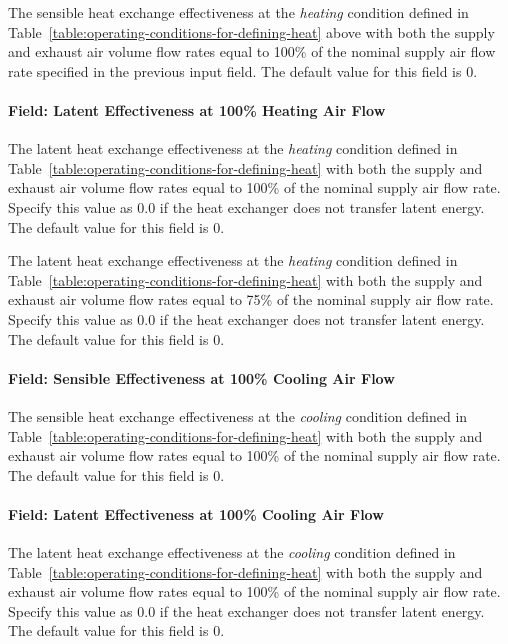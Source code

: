 The sensible heat exchange effectiveness at the \emph{heating} condition defined in Table~\ref{table:operating-conditions-for-defining-heat} above with both the supply and exhaust air volume flow rates equal to 100\% of the nominal supply air flow rate specified in the previous input field. The default value for this field is 0.

\paragraph{Field: Latent Effectiveness at 100\% Heating Air Flow}\label{field-latent-effectiveness-at-100-heating-air-flow}

The latent heat exchange effectiveness at the \emph{heating} condition defined in Table~\ref{table:operating-conditions-for-defining-heat} with both the supply and exhaust air volume flow rates equal to 100\% of the nominal supply air flow rate. Specify this value as 0.0 if the heat exchanger does not transfer latent energy. The default value for this field is 0.

The latent heat exchange effectiveness at the \emph{heating} condition defined in Table~\ref{table:operating-conditions-for-defining-heat} with both the supply and exhaust air volume flow rates equal to 75\% of the nominal supply air flow rate. Specify this value as 0.0 if the heat exchanger does not transfer latent energy. The default value for this field is 0.

\paragraph{Field: Sensible Effectiveness at 100\% Cooling Air Flow}\label{field-sensible-effectiveness-at-100-cooling-air-flow}

The sensible heat exchange effectiveness at the \emph{cooling} condition defined in Table~\ref{table:operating-conditions-for-defining-heat} with both the supply and exhaust air volume flow rates equal to 100\% of the nominal supply air flow rate. The default value for this field is 0.

\paragraph{Field: Latent Effectiveness at 100\% Cooling Air Flow}\label{field-latent-effectiveness-at-100-cooling-air-flow}

The latent heat exchange effectiveness at the \emph{cooling} condition defined in Table~\ref{table:operating-conditions-for-defining-heat} with both the supply and exhaust air volume flow rates equal to 100\% of the nominal supply air flow rate. Specify this value as 0.0 if the heat exchanger does not transfer latent energy. The default value for this field is 0.

